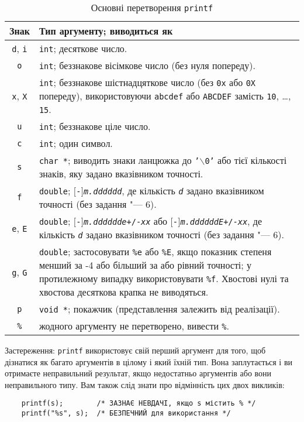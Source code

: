 \documentclass[a4paper,12pt]{book}
\begin{document}
  \begin{table}[!h]
  \caption{Основні перетворення \texttt{printf}}
  \label{f0:T7.1} 
  \centering
  \begin{tabular}{c|p{13cm}}
  \hline\hline
  Знак & Тип аргументу; виводиться як \\
  \hline
  \texttt{d}, \texttt{i} & \texttt{int}; десяткове число.\\
  \texttt{o} & \texttt{int}; беззнакове вісімкове число (без нуля попереду).\\
  \texttt{x}, \texttt{X} & \texttt{int}; беззнакове шістнадцяткове число (без
  \texttt{0x} або \texttt{0X} попереду), використовуючи \texttt{abcdef} або
  \texttt{ABCDEF} замість \texttt{10}, \ldots, \texttt{15}. \\
  \texttt{u} & \texttt{int}; беззнакове ціле число. \\
  \texttt{c} & \texttt{int}; один символ. \\
  \texttt{s} & \texttt{char *}; виводить знаки ланцюжка до
  \texttt{'\mbox{$\backslash$}0'} або тієї кількості знаків, яку задано вказівником
  точності. \\
  \texttt{f} & \texttt{double}; \texttt{\mbox{$[$}-\mbox{$]$}\textit{m.dddddd}}, де 
  кількість \texttt{\textit{d}} задано вказівником точності (без задання "--- 6). \\
  \texttt{е}, \texttt{Е} & \texttt{double}; 
  \texttt{\mbox{$[$}-\mbox{$]$}\textit{m.dddddde}+/-\textit{xx}} або
  \texttt{\mbox{$[$}-\mbox{$]$}\textit{m.ddddddE}+/-\textit{xx}}, де кількість
  \texttt{\textit{d}} задано вказівником точності (без задання "--- 6). \\
  \texttt{g}, \texttt{G} & \texttt{double}; застосовувати \texttt{\%e} або
  \texttt{\%E}, якщо показник степеня менший за -4 або більший за або рівний
  точності; у протилежному випадку використовувати \texttt{\%f}. Хвостові нулі та 
  хвостова десяткова крапка не виводяться. \\
  \texttt{p} & \texttt{void *}; покажчик (представлення залежить від реалізації). \\
  \texttt{\%} & жодного аргументу не перетворено, вивести \texttt{\%}.\\
  \hline
  \end{tabular}
  \end{table}
  Застереження: \texttt{printf} використовує свій перший аргумент для того, щоб дізнатися
  як багато аргументів в цілому і який їхній тип. Вона заплутається і ви отримаєте
  неправильний результат, якщо недостатньо аргументів або вони неправильного типу. Вам
  також слід знати про відмінність цих двох викликів:
  \begin{verbatim}
    printf(s);        /* ЗАЗНАЄ НЕВДАЧІ, якщо s містить % */
    printf("%s", s);  /* БЕЗПЕЧНИЙ для використання */
  \end{verbatim}
\end{document}
